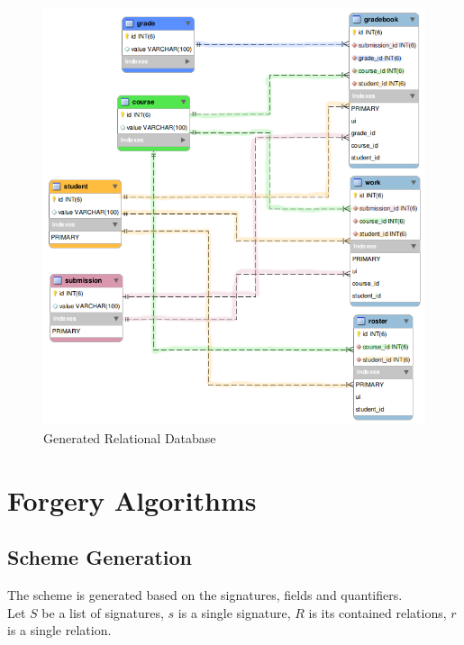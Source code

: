 \documentclass[oneside]{book}
\begin{document}
\newpage

\begin{figure}[h!]
\centering
\includegraphics[scale=0.5]{3}
\caption{Generated Relational Database}
\end{figure}

\newpage

\section{Forgery Algorithms}
\label{sec:algorithm}

\subsection{Scheme Generation}

The scheme is generated based on the signatures, fields and quantifiers.\\
Let $S$ be a list of signatures, $s$ is a single signature, $R$ is its contained relations, $r$ is a single relation.\\
\end{document}
